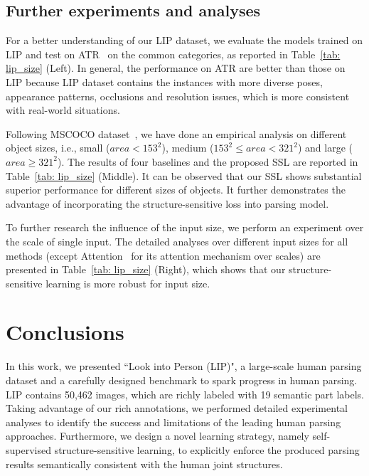 \documentclass[10pt,twocolumn,letterpaper]{article}
\begin{document}
\subsection{Further experiments and analyses}
For a better understanding of our LIP dataset, we evaluate the models trained on LIP and test on ATR~\cite{Co-CNN} on the common categories, as reported in Table~\ref{tab: lip_size} (Left). In general, the performance on ATR are better than those on LIP because LIP dataset contains the instances with more diverse poses, appearance patterns, occlusions and resolution issues, which is more consistent with real-world situations. 

Following MSCOCO dataset~\cite{DBLP:journals/corr/LinMBHPRDZ14}, we have done an empirical analysis on different object sizes, i.e., small ($area < 153^2$), medium ($153^2 \leq area < 321^2$) and large ($area \geq 321^2$). The results of four baselines and the proposed SSL are reported in Table~\ref{tab: lip_size} (Middle). It can be observed that our SSL shows substantial superior performance for different sizes of objects. It further demonstrates the advantage of incorporating the structure-sensitive loss into parsing model.

To further research the influence of the input size, we perform an experiment over the scale of single input. The detailed analyses over different input sizes for all methods (except Attention~\cite{chen2015attention} for its attention mechanism over scales) are presented in Table~\ref{tab: lip_size} (Right), which shows that our structure-sensitive learning is more robust for input size.

\section{Conclusions}
In this work, we presented ``Look into Person (LIP)", a large-scale human parsing dataset and a carefully designed benchmark to spark progress in human parsing. LIP contains 50,462 images, which are richly labeled with 19 semantic part labels. Taking advantage of our rich annotations, we performed detailed experimental analyses to identify the success and limitations of the leading human parsing approaches. Furthermore, we design a novel learning strategy, namely self-supervised structure-sensitive learning, to explicitly enforce the produced parsing results semantically consistent with the human joint structures. 


{\small


}
\end{document}
